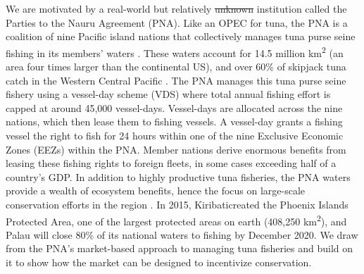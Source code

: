 \documentclass[12pt]{article}
\providecommand{\DIFaddtex}[1]{{\protect\color{blue}\uwave{#1}}} %
\providecommand{\DIFdeltex}[1]{{\protect\color{red}\sout{#1}}}                      %
\providecommand{\DIFaddbegin}{} %
\providecommand{\DIFaddend}{} %
\providecommand{\DIFdelbegin}{} %
\providecommand{\DIFdelend}{} %
\providecommand{\DIFadd}[1]{\texorpdfstring{\DIFaddtex{#1}}{#1}} %
\providecommand{\DIFdel}[1]{\texorpdfstring{\DIFdeltex{#1}}{}} %
\newcommand{\DIFscaledelfig}{0.5}
\newlength{\DIFdelgraphicswidth} %
\newlength{\DIFdelgraphicsheight} %
\newcommand{\DIFaddincludegraphics}[2][]{{\color{blue}\fbox{\DIFOincludegraphics[#1]{#2}}}} %
\newcommand{\DIFdelincludegraphics}[2][]{%
\sbox{\DIFdelgraphicsbox}{\DIFOincludegraphics[#1]{#2}}%
\settoboxwidth{\DIFdelgraphicswidth}{\DIFdelgraphicsbox} %
\settoboxtotalheight{\DIFdelgraphicsheight}{\DIFdelgraphicsbox} %
\scalebox{\DIFscaledelfig}{%
\parbox[b]{\DIFdelgraphicswidth}{\usebox{\DIFdelgraphicsbox}\\[-\baselineskip] \rule{\DIFdelgraphicswidth}{0em}}\llap{\resizebox{\DIFdelgraphicswidth}{\DIFdelgraphicsheight}{%
\setlength{\unitlength}{\DIFdelgraphicswidth}%
\begin{picture}(1,1)%
\thicklines\linethickness{2pt} %
{\color[rgb]{1,0,0}\put(0,0){\framebox(1,1){}}}%
{\color[rgb]{1,0,0}\put(0,0){\line( 1,1){1}}}%
{\color[rgb]{1,0,0}\put(0,1){\line(1,-1){1}}}%
\end{picture}%
}\hspace*{3pt}}} %
} %
\DeclareRobustCommand{\DIFaddbegin}{\DIFOaddbegin \let\includegraphics\DIFaddincludegraphics} %
\DeclareRobustCommand{\DIFaddend}{\DIFOaddend \let\includegraphics\DIFOincludegraphics} %
\DeclareRobustCommand{\DIFdelbegin}{\DIFOdelbegin \let\includegraphics\DIFdelincludegraphics} %
\DeclareRobustCommand{\DIFdelend}{\DIFOaddend \let\includegraphics\DIFOincludegraphics} %
\begin{document}
We are motivated by a real-world but relatively \DIFdelbegin \DIFdel{unknown }\DIFdelend \DIFaddbegin \DIFadd{understudied }\DIFaddend institution called the Parties to the Nauru Agreement (PNA). Like an OPEC for tuna, the PNA is a coalition of nine Pacific island nations that collectively manages tuna purse seine fishing in its members' waters \cite{havice_2013,aqorau_2018}. These waters account for 14.5 million km\textsuperscript{2} (an area four times larger than the continental US), and over 60\% of skipjack tuna catch in the Western Central Pacific \cite{havice_2013}. The PNA manages this tuna purse seine fishery using a vessel-day scheme (VDS) where total annual fishing effort is capped at around 45,000 vessel-days. Vessel-days are allocated across the nine nations, which then lease them to fishing vessels. A vessel-day grants a fishing vessel the right to fish for 24 hours within one of the nine Exclusive Economic Zones (EEZs) within the PNA. Member nations derive enormous benefits from leasing these fishing rights to foreign fleets, in some cases exceeding half of a country's GDP. In addition to highly productive tuna fisheries, the PNA waters provide a wealth of ecosystem benefits, hence the focus on large-scale conservation efforts in the region \cite{mcleod_2019}. In 2015, Kiribati\DIFaddbegin \DIFadd{, a PNA member, }\DIFaddend created the Phoenix Islands Protected Area, one of the largest protected areas on earth (408,250 km\textsuperscript{2}), and Palau will close 80\% of its national waters to fishing by December 2020. We draw from the PNA's market-based approach to managing tuna fisheries and build on it to show how the market can be designed to incentivize conservation.
\end{document}
